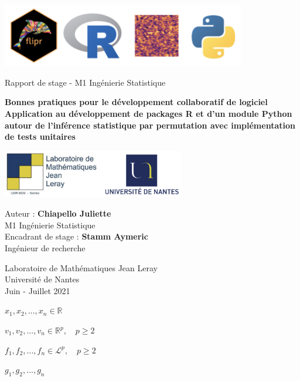 \documentclass{article}
\begin{document}
\begin{titlepage}
   \begin{center}
   \vspace{-1cm}
	 \includegraphics[width=0.8\textwidth]{logo.png}
	  \vspace{1cm}
	  
	  \LARGE Rapport de stage - M1 Ingénierie Statistique
       
       \vspace{2.5cm}
       \large
       
        \textbf{Bonnes pratiques pour le développement collaboratif de logiciel \\
       \vspace{0.5cm}
        Application au développement de packages R et d’un module Python autour de l’inférence statistique par permutation avec implémentation de tests unitaires}
            
       \vspace{3.5cm}

      

       \vfill
            
       

      \includegraphics[width=0.6\textwidth]{logoNantes.png}
      
		\vspace{0.8cm}
		
      Auteur :  \textbf{Chiapello Juliette} \\
      M1 Ingénierie Statistique\\
      \vspace{0.3cm}
      Encadrant de stage  :  \textbf{Stamm Aymeric}\\
      Ingénieur de recherche
       
       \vspace{0.8cm}
       
       Laboratoire de Mathématiques Jean Leray\\
       Université de Nantes\\
       Juin - Juillet 2021
            
   \end{center}
\end{titlepage}

\newpage

$x_1,  x_2, ... , x_n \in \mathbb{R}$

 \vspace{0.8cm}
 
 $v_1,  v_2, ... , v_n \in \mathbb{R}^p,  \quad p \geq 2$
 
  \vspace{0.8cm}
  
  $f_1,  f_2, ... , f_n \in \mathcal{L}^p,  \quad p \geq 2$
  
   \vspace{0.8cm}
   
   $g_1,  g_2, ... , g_n$
\end{document}

